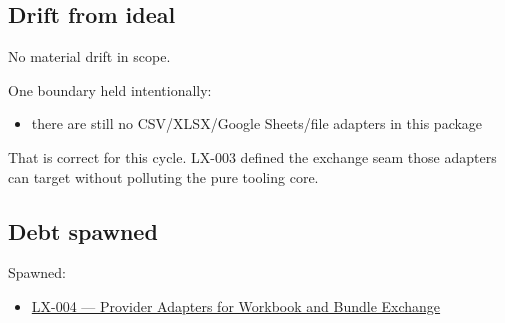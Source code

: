 \subsection{Drift from ideal}\label{record-190-drift-from-ideal}

No material drift in scope.

One boundary held intentionally:

\begin{itemize}
\tightlist
\item
  there are still no CSV/XLSX/Google Sheets/file adapters in this package
\end{itemize}

That is correct for this cycle. LX-003 defined the exchange seam those adapters can target without polluting the pure tooling core.

\subsection{Debt spawned}\label{record-190-debt-spawned}

Spawned:

\begin{itemize}
\tightlist
\item
  \href{https://github.com/flyingrobots/bijou/blob/cbd70612140e7a450d764b3c7be1c6af878b99bc/docs/method/graveyard/legacy-backlog/LX-004-provider-adapters-for-workbook-and-bundle-exchange.md}{LX-004 --- Provider Adapters for Workbook and Bundle Exchange}
\end{itemize}

